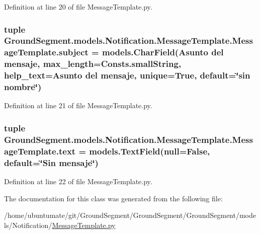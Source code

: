 Definition at line 20 of file Message\+Template.\+py.

\hypertarget{class_ground_segment_1_1models_1_1_notification_1_1_message_template_1_1_message_template_a4a30265144c01c3f2f44e6fd7d27c663}{}
\subsubsection[{subject}]{\setlength{\rightskip}{0pt plus 5cm}tuple Ground\+Segment.\+models.\+Notification.\+Message\+Template.\+Message\+Template.\+subject = models.\+Char\+Field(\textquotesingle{}Asunto del mensaje\textquotesingle{}, max\+\_\+length={\bf Consts.\+small\+String}, help\+\_\+text=\textquotesingle{}Asunto del mensaje\textquotesingle{}, unique=True, default=\char`\"{}sin nombre\char`\"{})\hspace{0.3cm}{\ttfamily [static]}}\label{class_ground_segment_1_1models_1_1_notification_1_1_message_template_1_1_message_template_a4a30265144c01c3f2f44e6fd7d27c663}


Definition at line 21 of file Message\+Template.\+py.

\hypertarget{class_ground_segment_1_1models_1_1_notification_1_1_message_template_1_1_message_template_a376fac3f79b54f6690e09fae5e2ea2d5}{}
\subsubsection[{text}]{\setlength{\rightskip}{0pt plus 5cm}tuple Ground\+Segment.\+models.\+Notification.\+Message\+Template.\+Message\+Template.\+text = models.\+Text\+Field(null=False, default=\char`\"{}Sin mensaje\char`\"{})\hspace{0.3cm}{\ttfamily [static]}}\label{class_ground_segment_1_1models_1_1_notification_1_1_message_template_1_1_message_template_a376fac3f79b54f6690e09fae5e2ea2d5}


Definition at line 22 of file Message\+Template.\+py.



The documentation for this class was generated from the following file\+:\begin{DoxyCompactItemize}
\item 
/home/ubuntumate/git/\+Ground\+Segment/\+Ground\+Segment/\+Ground\+Segment/models/\+Notification/\hyperlink{_message_template_8py}{Message\+Template.\+py}\end{DoxyCompactItemize}
